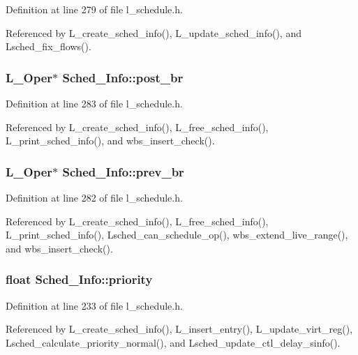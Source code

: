 Definition at line 279 of file l\_\-schedule.h.

Referenced by L\_\-create\_\-sched\_\-info(), L\_\-update\_\-sched\_\-info(), and Lsched\_\-fix\_\-flows().
\subsubsection{\setlength{\rightskip}{0pt plus 5cm}L\_\-Oper$\ast$ \bf{Sched\_\-Info::post\_\-br}}\label{structSched__Info_21ec4e846c59104aeca50c249167e8d5}




Definition at line 283 of file l\_\-schedule.h.

Referenced by L\_\-create\_\-sched\_\-info(), L\_\-free\_\-sched\_\-info(), L\_\-print\_\-sched\_\-info(), and wbs\_\-insert\_\-check().
\subsubsection{\setlength{\rightskip}{0pt plus 5cm}L\_\-Oper$\ast$ \bf{Sched\_\-Info::prev\_\-br}}\label{structSched__Info_567a780c15b4d3125f17bf391973003d}




Definition at line 282 of file l\_\-schedule.h.

Referenced by L\_\-create\_\-sched\_\-info(), L\_\-free\_\-sched\_\-info(), L\_\-print\_\-sched\_\-info(), Lsched\_\-can\_\-schedule\_\-op(), wbs\_\-extend\_\-live\_\-range(), and wbs\_\-insert\_\-check().
\subsubsection{\setlength{\rightskip}{0pt plus 5cm}float \bf{Sched\_\-Info::priority}}\label{structSched__Info_29b6c433f08d1f2b6f33bf9bcc728c1d}




Definition at line 233 of file l\_\-schedule.h.

Referenced by L\_\-create\_\-sched\_\-info(), L\_\-insert\_\-entry(), L\_\-update\_\-virt\_\-reg(), Lsched\_\-calculate\_\-priority\_\-normal(), and Lsched\_\-update\_\-ctl\_\-delay\_\-sinfo().
